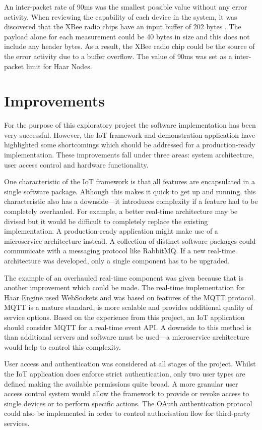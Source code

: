     An inter-packet rate of 90ms was the smallest possible value without any error activity. When reviewing the capability of each device in the system, it was discovered that the XBee radio chips have an input buffer of 202 bytes \citep{xbee-manual}. The payload alone for each measurement could be 40 bytes in size and this does not include any header bytes. As a result, the XBee radio chip could be the source of the error activity due to a buffer overflow. The value of 90ms was set as a inter-packet limit for Haar Nodes.

  \section{Improvements}
    For the purpose of this exploratory project the software implementation has been very successful. However, the IoT framework and demonstration application have highlighted some shortcomings which should be addressed for a production-ready implementation. These improvements fall under three areas: system architecture, user access control and hardware functionality.

    One characteristic of the IoT framework is that all features are encapsulated in a single software package. Although this makes it quick to get up and running, this characteristic also has a downside---it introduces complexity if a feature had to be completely overhauled. For example, a better real-time architecture may be divised but it would be difficult to completely replace the existing implementation. A production-ready application might make use of a microservice architecture instead. A collection of distinct software packages could communicate with a messaging protocol like RabbitMQ. If a new real-time architecture was developed, only a single component has to be upgraded.

    The example of an overhauled real-time component was given because that is another improvement which could be made. The real-time implementation for Haar Engine used WebSockets and was based on features of the MQTT protocol. MQTT is a mature standard, is more scalable and provides additional quality of service options. Based on the experience from this project, an IoT application should consider MQTT for a real-time event API. A downside to this method is than additional servers and software must be used---a microservice architecture would help to control this complexity.

    User access and authentication was considered at all stages of the project. Whilst the IoT application does enforce strict authentication, only two user types are defined making the available permissions quite broad. A more granular user access control system would allow the framework to provide or revoke access to single devices or to perform specific actions. The OAuth authentication protocol could also be implemented in order to control authorisation flow for third-party services.

